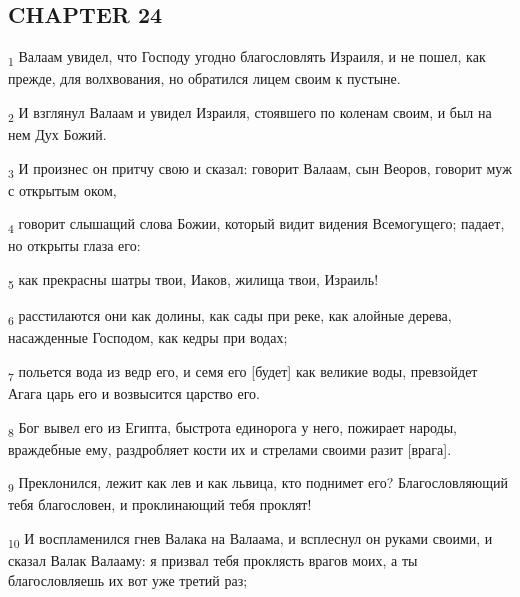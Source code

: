 \subsection{CHAPTER 24}
\begin{tcolorbox}
\textsubscript{1} Валаам увидел, что Господу угодно благословлять Израиля, и не пошел, как прежде, для волхвования, но обратился лицем своим к пустыне.
\end{tcolorbox}
\begin{tcolorbox}
\textsubscript{2} И взглянул Валаам и увидел Израиля, стоявшего по коленам своим, и был на нем Дух Божий.
\end{tcolorbox}
\begin{tcolorbox}
\textsubscript{3} И произнес он притчу свою и сказал: говорит Валаам, сын Веоров, говорит муж с открытым оком,
\end{tcolorbox}
\begin{tcolorbox}
\textsubscript{4} говорит слышащий слова Божии, который видит видения Всемогущего; падает, но открыты глаза его:
\end{tcolorbox}
\begin{tcolorbox}
\textsubscript{5} как прекрасны шатры твои, Иаков, жилища твои, Израиль!
\end{tcolorbox}
\begin{tcolorbox}
\textsubscript{6} расстилаются они как долины, как сады при реке, как алойные дерева, насажденные Господом, как кедры при водах;
\end{tcolorbox}
\begin{tcolorbox}
\textsubscript{7} польется вода из ведр его, и семя его [будет] как великие воды, превзойдет Агага царь его и возвысится царство его.
\end{tcolorbox}
\begin{tcolorbox}
\textsubscript{8} Бог вывел его из Египта, быстрота единорога у него, пожирает народы, враждебные ему, раздробляет кости их и стрелами своими разит [врага].
\end{tcolorbox}
\begin{tcolorbox}
\textsubscript{9} Преклонился, лежит как лев и как львица, кто поднимет его? Благословляющий тебя благословен, и проклинающий тебя проклят!
\end{tcolorbox}
\begin{tcolorbox}
\textsubscript{10} И воспламенился гнев Валака на Валаама, и всплеснул он руками своими, и сказал Валак Валааму: я призвал тебя проклясть врагов моих, а ты благословляешь их вот уже третий раз;
\end{tcolorbox}
